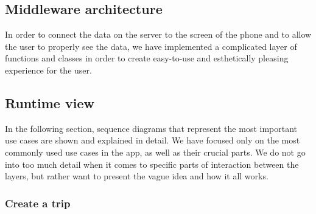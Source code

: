 \subsection{Middleware architecture}
\hspace{\parindent}In order to connect the data on the server to the screen of the phone and to allow the user to properly see the data, we have implemented a complicated layer of functions and classes in order to create easy-to-use and esthetically pleasing experience for the user.

\subsection{Runtime view}

\hspace{\parindent}In the following section, sequence diagrams that represent the most important use cases are shown and explained in detail. We have focused only on the most commonly used use cases in the app, as well as their crucial parts. We do not go into too much detail when it comes to specific parts of interaction between the layers, but rather want to present the vague idea and how it all works.
\newpage
\subsubsection{Create a trip}

